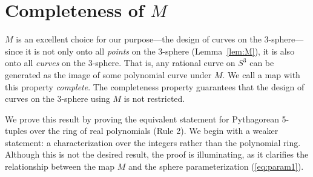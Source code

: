 


\section{Completeness of $M$}
\label{sec:complete}

$M$ is an excellent choice for our purpose---the design of curves on
the 3-sphere---since it is not only onto all {\em points} on the 3-sphere 
(Lemma~\ref{lem:M}),
it is also onto all {\em curves} on the 3-sphere.
That is, any rational curve on $S^3$
can be generated as the image of some polynomial curve under $M$.
We call a map with this property {\em complete}.
The completeness property guarantees that the design of curves on the 3-sphere 
using $M$ is not restricted.

We prove this result by proving the equivalent statement for Pythagorean
5-tuples over the ring of real polynomials (Rule 2).
We begin with a weaker statement: a characterization over the integers
rather than the polynomial ring.
Although this is not the desired result,
the proof is illuminating, as it clarifies the relationship between
the map $M$ and the sphere parameterization (\ref{eq:param1}).

